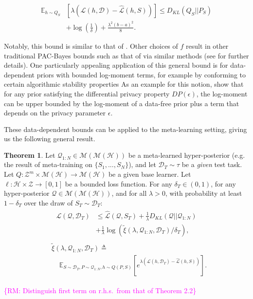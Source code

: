 \documentclass[letterpaper]{article} %
\theoremstyle{definition}
\newtheorem{theorem}{Theorem}[section]
\newcommand{\Expect}[2]{\mathbb{E}_{#1}\left [#2 \right ]}
\newcommand{\RM}[1]{\textcolor{magenta}{\{RM: #1\}}}
\begin{document}
\begin{align} 
    \mathbb{E}_{h\sim Q_S}&\left [\lambda(\mathcal{L}(h,\mathcal{D})-\hat{\mathcal{L}}(h, S))\right ]
     \leq D_{KL}(Q_S||P_S) \nonumber\\
    &+\log\left (\frac{1}{\delta}\right ) + \frac{\lambda^2(b-a)^2}{8} .
\end{align}

Notably, this bound is similar to that of \citet{Catoni2004}. Other choices of $f$ result in other traditional PAC-Bayes bounds such as that of \citet{Mcallester} via similar methods (see \citet{Rivasplata2020} for further details). 
One particularly appealing application of this general bound is for data-dependent priors with bounded log-moment terms, for example by conforming to certain algorithmic stability properties 
As an example for this notion, \citet{Rivasplata2020} show that for any prior satisfying the differential privacy property $DP(\epsilon)$, the log-moment can be upper bounded by the log-moment of a data-free prior plus a term that depends on the privacy parameter $\epsilon$. 

These data-dependent bounds can be applied to the meta-learning setting, giving us the following general result. 
%
\begin{theorem} \label{thm:main-result}
	Let $\mathcal{Q}_{1:N}\in \mathcal{M}(\mathcal{M}(\mathcal{H}))$ be a meta-learned hyper-posterior (e.g. the result of meta-training on $\{S_1,...,S_N\}$), and let $\mathcal{D}_T\sim \tau$ be a \emph{given} test task. Let $Q: \mathcal{Z}^m\times\mathcal{M}(\mathcal{H})\rightarrow \mathcal{M}(\mathcal{H})$ be a given base learner. Let $\ell: \mathcal{H}\times \mathcal{Z}\rightarrow [0, 1]$ be a bounded loss function.
	For any $\delta_T \in (0,1)$, for any hyper-posterior $\mathcal{Q}\in \mathcal{M}(\mathcal{M}(\mathcal{H}))$, and for all $\lambda>0$, with probability at least $1-\delta_T$ over the draw of $S_T\sim \mathcal{D}_T$:
	\begin{align} \label{eq:main-result-generic}
	\begin{split}
	\mathcal{L}(\mathcal{Q}, \mathcal{D}_T) &\leq \hat{\mathcal{L}}(\mathcal{Q}, S_T) + \frac{1}{\lambda}D_{KL}(\mathcal{Q}||\mathcal{Q}_{1:N})\\
	&+\frac{1}{\lambda}\log\left ( \tilde{\xi}(\lambda,\mathcal{Q}_{1:N},\mathcal{D}_T)/\delta_T\right ) ,
	\end{split}
	\end{align}
%
	\begin{align*} 
	\begin{split}
	&\tilde{\xi}(\lambda,\mathcal{Q}_{1:N},\mathcal{D}_T)\triangleq \\
	&\;\;\;\; \Expect{S\sim \mathcal{D}_T, P\sim \mathcal{Q}_{1:N}, h\sim Q(P,S)}{e^{\lambda\left (\mathcal{L}(h, \mathcal{D}_T)-\hat{\mathcal{L}}(h, S)\right )}} .
	\end{split}
	\end{align*}
\end{theorem}
\RM{Distinguish first term on r.h.s.~from that of Theorem 2.2}
\end{document}
